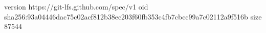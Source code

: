 version https://git-lfs.github.com/spec/v1
oid sha256:93a04446dac75c02acf812b38ec203f60fb353c4fb7cbcc99a7c02112a9f516b
size 87544
